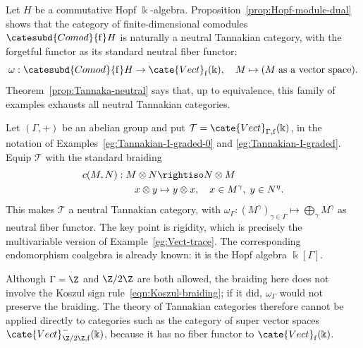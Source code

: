\begin{example}
	Let $H$ be a commutative Hopf $\Bbbk$-algebra.
	Proposition~\ref{prop:Hopf-module-dual} shows that the category of
	finite-dimensional comodules $\catesubd{Comod}{\mathrm f}H$ is naturally
	a neutral Tannakian category, with the forgetful functor as its standard
	neutral fiber functor:
	\[ \omega: \catesubd{Comod}{\mathrm{f}}H \to \cate{Vect}_{\mathrm{f}}(\Bbbk), \quad M \mapsto (M\;\text{as a vector space}). \]
	Theorem~\ref{prop:Tannaka-neutral} says that, up to equivalence, this
	family of examples exhausts all neutral Tannakian categories.
\end{example}

\begin{example}
	Let $(\Gamma,+)$ be an abelian group and put
	$\mathcal{T}=\cate{Vect}_{\Gamma,\mathrm f}(\Bbbk)$, in the notation of
	Examples~\ref{eg:Tannakian-I-graded-0} and
	\ref{eg:Tannakian-I-graded}. Equip $\mathcal{T}$ with the standard
	braiding
	\begin{align*}
		c(M, N): M \otimes N & \rightiso N \otimes M \\
		x \otimes y & \mapsto y \otimes x, \quad x \in M^\gamma, \; y \in N^\eta.
	\end{align*}
	This makes $\mathcal{T}$ a neutral Tannakian category, with
	$\omega_\Gamma:(M^\gamma)_{\gamma\in\Gamma}\mapsto
	\bigoplus_\gamma M^\gamma$ as neutral fiber functor. The key point is
	rigidity, which is precisely the multivariable version of
	Example~\ref{eg:Vect-trace}. The corresponding endomorphism coalgebra is
	already known: it is the Hopf algebra $\Bbbk[\Gamma]$.

	Although $\Gamma=\Z$ and $\Z/2\Z$ are both allowed, the braiding here
	does not involve the Koszul sign rule~\eqref{eqn:Koszul-braiding}; if it
	did, $\omega_\Gamma$ would not preserve the braiding. The theory of
	Tannakian categories therefore cannot be applied directly to categories
	such as the category of super vector spaces
	$\cate{Vect}^-_{\Z/2\Z,\mathrm f}(\Bbbk)$, because it has no fiber
	functor to $\cate{Vect}_{\mathrm f}(\Bbbk)$.
\end{example}


